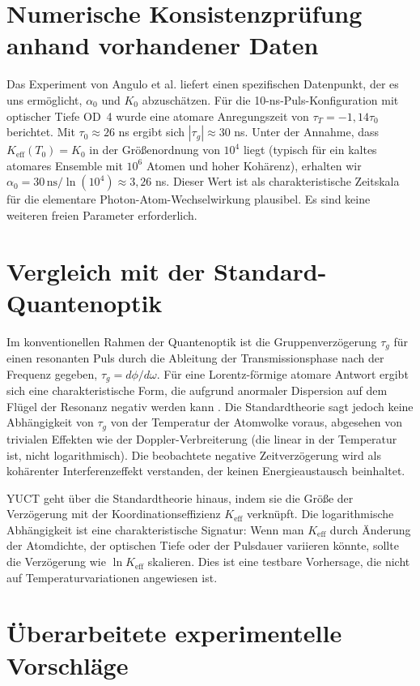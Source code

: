\documentclass[12pt,a4paper]{article}
\newcommand{\Keff}{K_{\mathrm{eff}}}
\begin{document}
	\section{Numerische Konsistenzprüfung anhand vorhandener Daten}
	
	Das Experiment von Angulo et al. \cite{Angulo2024} liefert einen spezifischen Datenpunkt, der es uns ermöglicht, \(\alpha_0\) und \(K_0\) abzuschätzen. Für die 10-ns-Puls-Konfiguration mit optischer Tiefe OD~4 wurde eine atomare Anregungszeit von \(\tau_T = -1,14 \tau_0\) berichtet. Mit \(\tau_0 \approx 26\) ns ergibt sich \(|\tau_g| \approx 30\) ns. Unter der Annahme, dass \(\Keff(T_0) = K_0\) in der Größenordnung von \(10^4\) liegt (typisch für ein kaltes atomares Ensemble mit \(10^6\) Atomen und hoher Kohärenz), erhalten wir \(\alpha_0 = 30\,\text{ns} / \ln(10^4) \approx 3,26\) ns. Dieser Wert ist als charakteristische Zeitskala für die elementare Photon-Atom-Wechselwirkung plausibel. Es sind keine weiteren freien Parameter erforderlich.
	
	\section{Vergleich mit der Standard-Quantenoptik}
	
	Im konventionellen Rahmen der Quantenoptik ist die Gruppenverzögerung \(\tau_g\) für einen resonanten Puls durch die Ableitung der Transmissionsphase nach der Frequenz gegeben, \(\tau_g = d\phi/d\omega\). Für eine Lorentz-förmige atomare Antwort ergibt sich eine charakteristische Form, die aufgrund anormaler Dispersion auf dem Flügel der Resonanz negativ werden kann \cite{Milonni2004}. Die Standardtheorie sagt jedoch keine Abhängigkeit von \(\tau_g\) von der Temperatur der Atomwolke voraus, abgesehen von trivialen Effekten wie der Doppler-Verbreiterung (die linear in der Temperatur ist, nicht logarithmisch). Die beobachtete negative Zeitverzögerung wird als kohärenter Interferenzeffekt verstanden, der keinen Energieaustausch beinhaltet.
	
	YUCT geht über die Standardtheorie hinaus, indem sie die Größe der Verzögerung mit der Koordinationseffizienz \(\Keff\) verknüpft. Die logarithmische Abhängigkeit ist eine charakteristische Signatur: Wenn man \(\Keff\) durch Änderung der Atomdichte, der optischen Tiefe oder der Pulsdauer variieren könnte, sollte die Verzögerung wie \(\ln\Keff\) skalieren. Dies ist eine testbare Vorhersage, die nicht auf Temperaturvariationen angewiesen ist.
	
	\section{Überarbeitete experimentelle Vorschläge}
	
\end{document}
